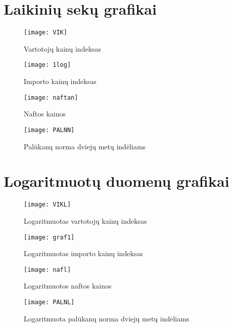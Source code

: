 \documentclass[a4paper]{article}
\begin{document}
\section{Laikinių sekų grafikai}

\begin{figure}[H]
\centering 
\texttt{[image: VIK]}
\caption{Vartotojų kainų indeksas}
\end{figure}

\begin{figure}[H]
\centering 
\texttt{[image: 1log]}
\caption{Importo kainų indeksas}
\end{figure}


\begin{figure}[H]
\centering 
\texttt{[image: naftan]}
\caption{Naftos kainos}
\end{figure}

\begin{figure}[H]
\centering 
\texttt{[image: PALNN]}
\caption{Palūkanų norma dviejų metų indėliams}
\end{figure}
\newpage

\section{Logaritmuotų duomenų grafikai}
\begin{figure}[H]
\centering 
\texttt{[image: VIKL]}
\caption{Logaritmuotas vartotojų kainų indeksas}
\end{figure}

\begin{figure}[H]
\centering 
\texttt{[image: graf1]}
\caption{Logaritmuotas importo kainų indeksas}
\end{figure}



\begin{figure}[H]
\centering 
\texttt{[image: nafl]}
\caption{Logaritmuotos naftos kainos}
\end{figure}

\begin{figure}[H]
\centering 
\texttt{[image: PALNL]}
\caption{Logaritmuota palūkanų norma dviejų metų indėliams}
\end{figure}


\newpage
\end{document}
